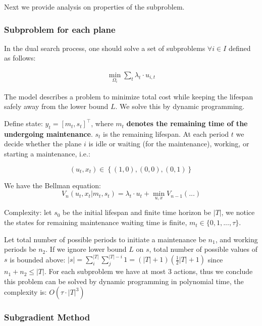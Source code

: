 \documentclass[../main]{subfiles}
\begin{document}
Next we provide analysis on properties of the subproblem.

\hypertarget{subproblem-for-each-plane}{%
  \subsubsection{Subproblem for each
    plane}\label{subproblem-for-each-plane}}

In the dual search process, one should solve a set of subproblems
\(\forall i\in I\) defined as follows:

\[\begin{aligned}
    \min_{\Omega_i} \sum_t \lambda_t \cdot u_{i,t}
  \end{aligned}\]

The model describes a problem to minimize total cost while keeping the
lifespan safely away from the lower bound \(L\). We solve this by
dynamic programming.

Define state: \(y_t = \left[m_t,s_t \right]^\top\), where \(m_t\)
\textbf{denotes the remaining time of the undergoing maintenance}.
\(s_t\) is the remaining lifespan. At each period \(t\) we decide
whether the plane \(i\) is idle or waiting (for the maintenance),
working, or starting a maintenance, i.e.:

\[(u_t, x_t) \in \left\{(1, 0), (0,0), (0, 1)\right\}\]

We have the Bellman equation:
\[V_n(u_t, x_t | m_t, s_t) = \lambda_t \cdot u_t + \min_{u,x} V_{n-1}(...)\]

Complexity: let \(s_0\) be the initial lifespan and finite time horizon
be \(|T|\), we notice the states for remaining maintenance waiting time
is finite, \(m_t \in \{0, 1, ..., \tau\}\).

Let total number of possible periods to initiate a maintenance be
\(n_1\), and working periods be \(n_2\). If we ignore lower bound \(L\)
on \(s\), total number of possible values of \(s\) is bounded above:
\(|s| = \sum_i^{|T|}\sum_j^{|T| - i} 1=(|T| + 1)(\frac{1}{2}|T| + 1)\)
since \(n_1 + n_2 \le |T|\). For each subproblem we have at most 3
actions, thus we conclude this problem can be solved by dynamic
programming in polynomial time, the complexity is:
\(O\left(\tau\cdot|T|^3 \right)\)

\hypertarget{subgradient-method}{%
  \subsubsection{Subgradient Method}\label{subgradient-method}}
\end{document}
